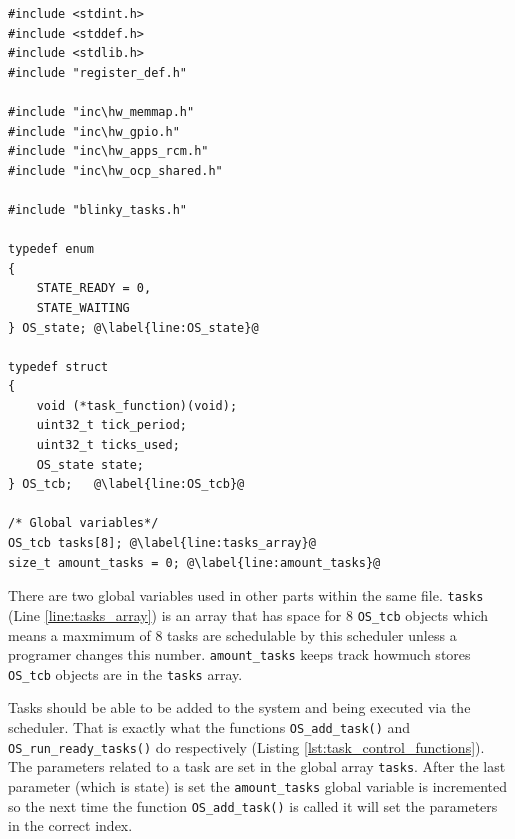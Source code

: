 \begin{lstlisting}[style=CStyle, caption={Definition code where a state datatype and housekeeping datatype for tasks is made}, captionpos=b, label={lst:def_scheduler}, escapechar=@]
#include <stdint.h>
#include <stddef.h>
#include <stdlib.h>
#include "register_def.h"

#include "inc\hw_memmap.h"
#include "inc\hw_gpio.h"
#include "inc\hw_apps_rcm.h"
#include "inc\hw_ocp_shared.h"

#include "blinky_tasks.h"

typedef enum
{
    STATE_READY = 0,
    STATE_WAITING
} OS_state; @\label{line:OS_state}@

typedef struct
{
    void (*task_function)(void);
    uint32_t tick_period;
    uint32_t ticks_used;
    OS_state state;
} OS_tcb;   @\label{line:OS_tcb}@

/* Global variables*/
OS_tcb tasks[8]; @\label{line:tasks_array}@
size_t amount_tasks = 0; @\label{line:amount_tasks}@
\end{lstlisting}

There are two global variables used in other parts within the same file.
\texttt{tasks} (Line \ref{line:tasks_array}) is an array that has space for 8 \texttt{OS\_tcb} objects which means a maxmimum of 8 tasks are schedulable by this scheduler unless a programer changes this number.
\texttt{amount\_tasks} keeps track howmuch stores \texttt{OS\_tcb} objects are in the \texttt{tasks} array.

\newpage
Tasks should be able to be added to the system and being executed via the scheduler.
That is exactly what the functions \texttt{OS\_add\_task()} and \texttt{OS\_run\_ready\_tasks()} do respectively (Listing \ref{lst:task_control_functions}).
The parameters related to a task are set in the global array \texttt{tasks}.
After the last parameter (which is state) is set the \texttt{amount\_tasks} global variable is incremented so the next time the function \texttt{OS\_add\_task()} is called it will set the parameters in the correct index.

